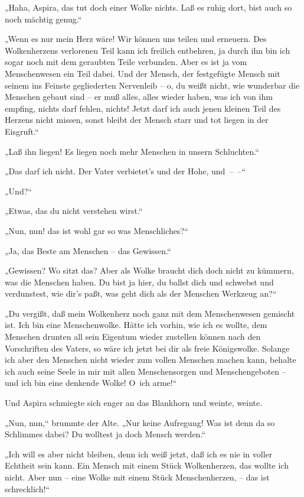 „Haha, Aspira, das tut doch einer Wolke nichts. Laß es ruhig dort,
bist auch so noch mächtig genug.“

„Wenn es nur mein Herz wäre! Wir können uns teilen und erneuern.
Des Wolkenherzens verlorenen Teil kann ich freilich entbehren, ja
durch ihn bin ich sogar noch mit dem geraubten Teile verbunden.
Aber es ist ja vom Menschenwesen ein Teil dabei. Und der Mensch,
der festgefügte Mensch mit seinem ins Feinste gegliederten
Nervenleib – o, du weißt nicht, wie wunderbar die Menschen gebaut
sind – er muß alles, alles wieder haben, was ich von ihm empfing,
nichts darf fehlen, nichts! Jetzt darf ich auch jenen kleinen Teil
des Herzens nicht missen, sonst bleibt der Mensch starr und tot
liegen in der Eisgruft.“

„Laß ihn liegen! Es liegen noch mehr Menschen in unsern
Schluchten.“

„Das darf ich nicht. Der Vater verbietet's und der Hohe, und~–~–“

„Und?“

„Etwas, das du nicht verstehen wirst.“

„Nun, nun! das ist wohl gar so was Menschliches?“

„Ja, das Beste am Menschen – das Gewissen.“

„Gewissen? Wo sitzt das? Aber als Wolke braucht dich doch nicht zu
kümmern, was die Menschen haben. Du bist ja hier, du ballst dich
und schwebst und verdunstest, wie dir's paßt, was geht dich als der
Menschen Werkzeug an?“

„Du vergißt, daß mein Wolkenherz noch ganz mit dem Menschenwesen
gemischt ist. Ich bin eine Menschenwolke. Hätte ich vorhin, wie ich
es wollte, dem Menschen drunten all sein Eigentum wieder zustellen
können nach den Vorschriften des Vaters, so wäre ich jetzt bei dir
als freie Königswolke. Solange ich aber den Menschen nicht wieder
zum vollen Menschen machen kann, behalte ich auch seine Seele in
mir mit allen Menschensorgen und Menschengeboten – und ich bin eine
denkende Wolke! O~ich arme!“

Und Aspira schmiegte sich enger an das Blankhorn und weinte,
weinte.

„Nun, nun,“ brummte der Alte. „Nur keine Aufregung! Was ist denn da
so Schlimmes dabei? Du wolltest ja doch Mensch werden.“

„Ich will es aber nicht bleiben, denn ich weiß jetzt, daß ich es
nie in voller Echtheit sein kann. Ein Mensch mit einem Stück
Wolkenherzen, das wollte ich nicht. Aber nun – eine Wolke mit einem
Stück Menschenherzen, – das ist schrecklich!“


